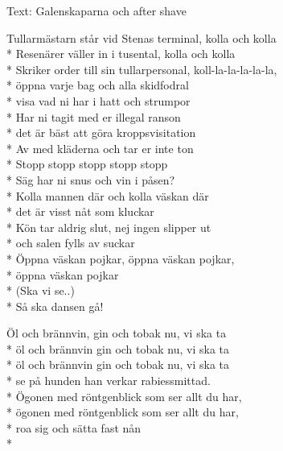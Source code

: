 \begin{SongText}[Tullarmästarn]
    \begin{SongInfo}
        Text: Galenskaparna och after shave
    \end{SongInfo}
    \begin{SongVerse}
        Tullarmästarn står vid Stenas terminal, kolla och kolla\\*%
        Resenärer väller in i tusental, kolla och kolla\\*%
        Skriker order till sin tullarpersonal, koll-la-la-la-la-la,\\*%
        öppna varje bag och alla skidfodral\\*%
        visa vad ni har i hatt och strumpor\\*%
        Har ni tagit med er illegal ranson\\*%
        det är bäst att göra kroppsvisitation\\*%
        Av med kläderna och tar er inte ton\\*%
        Stopp stopp stopp stopp stopp\\*%
        Säg har ni snus och vin i påsen?\\*%
        Kolla mannen där och kolla väskan där\\*%
        det är visst nåt som kluckar\\*%
        Kön tar aldrig slut, nej ingen slipper ut\\*%
        och salen fylls av suckar\\*%
        Öppna väskan pojkar, öppna väskan pojkar,\\*%
        öppna väskan pojkar\\*%
        (Ska vi se..)\\*%
        Så ska dansen gå!
    \end{SongVerse}
    \begin{SongVerse}
        Öl och brännvin, gin och tobak nu, vi ska ta\\*%
        öl och brännvin gin och tobak nu, vi ska ta\\*%
        öl och brännvin gin och tobak nu, vi ska ta\\*%
        se på hunden han verkar rabiessmittad.\\*%
        Ögonen med röntgenblick som ser allt du har,\\*%
        ögonen med röntgenblick som ser allt du har,\\*%
        roa sig och sätta fast nån\\*%

\end{SongVerse}
\end{SongText}

